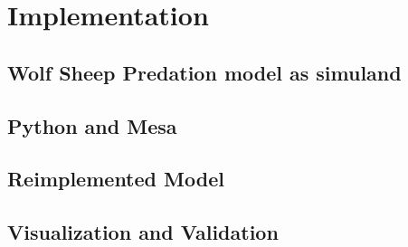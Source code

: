 
\section{Implementation}\label{sec:Implementation}

    \subsection{Wolf Sheep Predation model as simuland}
        \label{sec:Simuland WSP}
    \subsection{Python and Mesa}
        \label{sec:Python and Mesa}

    \subsection{Reimplemented Model}
        \label{sec:Reimplemented Model}

    \subsection{Visualization and Validation}
        \label{sec:Visualization and Validation}